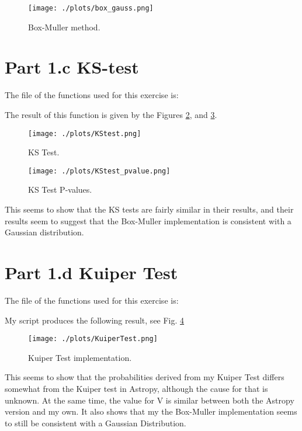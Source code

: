 \begin{figure}[h!]
  \centering
  \texttt{[image: ./plots/box\_gauss.png]}
  \caption{Box-Muller method.}
  \label{fig:boxmuller}
\end{figure}


\section{Part 1.c KS-test}

The file of the functions used for this exercise is:



The result of this function is given by the Figures \ref{fig:kstest}, and \ref{fig:kstestP}.

\begin{figure}[h!]
  \centering
  \texttt{[image: ./plots/KStest.png]}
  \caption{KS Test.}
  \label{fig:kstest}
\end{figure}


\begin{figure}[h!]
  \centering
  \texttt{[image: ./plots/KStest\_pvalue.png]}
  \caption{KS Test P-values.}
  \label{fig:kstestP}
\end{figure}

This seems to show that the KS tests are fairly similar in their results, and their results seem to
suggest that the Box-Muller implementation is consistent with a Gaussian distribution.


\section{Part 1.d Kuiper Test}

The file of the functions used for this exercise is:



My script produces the following result, see Fig. \ref{fig:kuiperTest}

\begin{figure}[h!]
  \centering
  \texttt{[image: ./plots/KuiperTest.png]}
  \caption{Kuiper Test implementation.}
  \label{fig:kuiperTest}
\end{figure}

This seems to show that the probabilities derived from my Kuiper Test differs somewhat from the Kuiper test in Astropy, although the cause for that is unknown. At
the same time, the value for V is similar between both the Astropy version and my own.
It also shows that my the Box-Muller implementation seems to still be consistent with a Gaussian Distribution.


